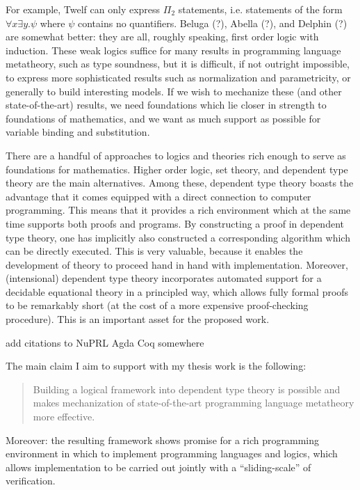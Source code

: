 \documentclass{article}
\newcommand{\LONGVERSION}[1]{{\color{light-gray}#1}}
\begin{document}
For example, Twelf \citep{Pfenning99cade} can only express $\Pi_2$
statements, i.e. statements of the form $\forall x \exists y. \psi$
where $\psi$ contains no quantifiers. Beluga (?), Abella (?), and
Delphin (?) are
somewhat better: they are all, roughly speaking, first order logic
with induction. These weak logics suffice for many results in
programming language metatheory, such as type soundness, but it is
difficult, if not outright impossible, to express more sophisticated
results such as normalization and parametricity, or generally to build
interesting models. If we wish to mechanize these (and other
state-of-the-art) results, we need foundations which lie closer in
strength to foundations of mathematics, and we want as much support as
possible for variable binding and substitution.

There are a handful of approaches to logics and theories rich enough
to serve as foundations for mathematics. Higher order logic, set theory, and dependent
type theory are the main alternatives. Among these, dependent type theory
\citep{Martin-Loef73a} boasts the advantage that it comes equipped with a direct
connection to computer programming. This means that it provides a rich
environment which at the same time supports both proofs and
programs. By constructing a proof in dependent type theory, one has
implicitly also constructed a corresponding algorithm which can be
directly executed. This is very valuable, because it
enables the development of theory to proceed hand in hand
with implementation. Moreover, (intensional) dependent type theory
incorporates automated support for a decidable equational theory in a
principled way, which allows fully formal proofs to be remarkably
short (at the cost of a more expensive proof-checking
procedure). This is an important asset for the proposed work. 

\LONGVERSION{add citations to NuPRL \citep{NuPRL} Agda \citep{Norell:phd07} Coq
\citep{bertot/casteran:2004} somewhere}

The main claim I aim to support with my thesis work is the following:

\begin{quote}Building a logical framework into dependent type
theory is possible and makes mechanization of state-of-the-art programming
language metatheory more effective.
\end{quote}

Moreover: the resulting framework shows promise for a rich programming
environment in which to implement programming languages and logics, which allows
implementation to be carried out jointly with a ``sliding-scale'' of
verification.
\end{document}
